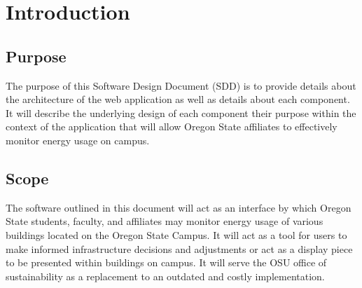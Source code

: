 \documentclass[journal,10pt,onecolumn,compsoc]{IEEEtran}
\begin{document}
       \newpage
    \clearpage
    
    \section{Introduction}
    \subsection{Purpose}
	
    The purpose of this Software Design Document (SDD) is to provide details about the architecture of the web application as well
	as details about each component. It will describe the underlying design of each component their purpose within the context
	of the application that will allow Oregon State affiliates to effectively monitor energy usage on campus.
	
    \subsection{Scope}
    
	The software outlined in this document will act as an interface by which Oregon State students, faculty, and affiliates
	may monitor energy usage of various buildings located on the Oregon State Campus. It will act as a tool for users to 
	make informed infrastructure decisions and adjustments or act as a display piece to be presented within buildings on campus.
	It will serve the OSU office of sustainability as a replacement to an outdated and costly implementation. 
	
\end{document}
